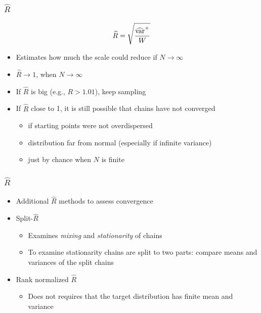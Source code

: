 \documentclass[10pt]{beamer}
\begin{document}
\begin{frame}

\frametitle{ $\widehat{R}$}

  \begin{equation*}
      \widehat{R}=\sqrt{\frac{\widehat{\mathrm{var}}^{+}}{W}}
    \end{equation*}
    \begin{itemize}
    \item<1-> Estimates how much the scale could reduce if $N\rightarrow\infty$
    \item<1-> $\widehat{R}\rightarrow 1$, when $N\rightarrow\infty$
    \item<1-> If $\widehat{R}$ is big (e.g., $R>1.01$), keep sampling
    \item<2-> If $\widehat{R}$ close to 1, it is still possible that chains have not converged
      \begin{itemize}
      \item if starting points were not overdispersed
      \item distribution far from normal (especially if infinite variance)
      \item just by chance when $N$ is finite
      \end{itemize}
    \end{itemize}

\end{frame}

\begin{frame}[fragile]

\frametitle{$\widehat{R}$}

  \begin{itemize}
  \item Additional $\widehat{R}$ methods to assess convergence
  \item Split-$\widehat{R}$
  \begin{itemize}
    \item Examines {\it mixing} and {\it stationarity} of chains
    \item To examine stationarity chains are split to two parts: compare means and variances of the split chains
  \end{itemize}
  \pause
  \item Rank normalized $\widehat{R}$
  \begin{itemize}
    \item Does not requires that the target distribution has finite mean and variance
  \end{itemize}
  \end{itemize}

\end{frame}
\end{document}
